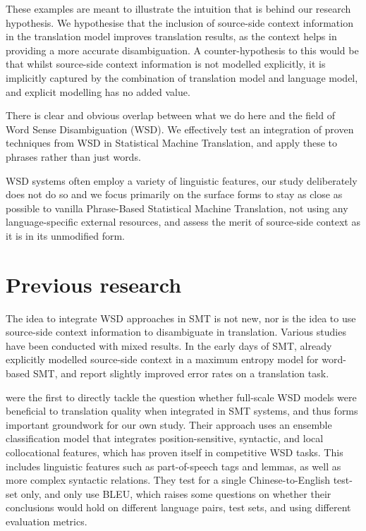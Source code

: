 \documentclass[11pt]{article}
\begin{document}
These examples are meant to illustrate the intuition that is behind our
research hypothesis. We hypothesise that the inclusion of source-side context
information in the translation model improves translation results, as the
context helps in providing a more accurate disambiguation. A counter-hypothesis
to this would be that whilst source-side context information is not modelled
explicitly, it is implicitly captured by the combination of translation model
and language model, and explicit modelling has no added value.

There is clear and obvious overlap between what we do here and the field of
Word Sense Disambiguation (WSD). We effectively test an integration of proven
techniques from WSD in Statistical Machine Translation, and apply these to
phrases rather than just words.

WSD systems often employ a variety of linguistic features, our study
deliberately does not do so and we focus primarily on the surface forms to stay
as close as possible to vanilla Phrase-Based Statistical Machine Translation,
not using any language-specific external resources, and assess the merit of
source-side context as it is in its unmodified form. 

\section{Previous research}

The idea to integrate WSD approaches in SMT is not new, nor is the idea to use source-side context information to disambiguate in translation. Various studies have been conducted with mixed results. In the early days of SMT, \cite{GarciaVarea+02} already explicitly modelled source-side context in a maximum entropy model for word-based SMT, and report slightly improved error rates on a translation task.

\cite{CarpuatWu05} were the first to
directly tackle the question whether full-scale WSD models were beneficial to translation
quality when integrated in SMT systems, and thus forms important groundwork for
our own study. Their approach uses an ensemble classification model that
integrates position-sensitive, syntactic, and local collocational features,
which has proven itself in competitive WSD tasks. This includes linguistic
features such as part-of-speech tags and lemmas, as well as more complex
syntactic relations. They test for a single Chinese-to-English test-set only, and
only use BLEU, which raises some questions on whether their conclusions would hold
on different language pairs, test sets, and using different evaluation metrics.
\end{document}
